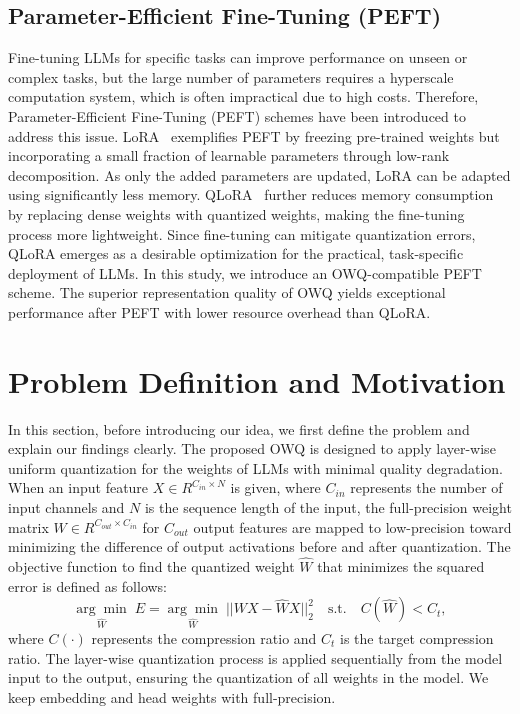 \documentclass[letterpaper]{article} %
\begin{document}
\subsection{Parameter-Efficient Fine-Tuning (PEFT)}
Fine-tuning LLMs for specific tasks can improve performance on unseen or complex tasks, but the large number of parameters requires a hyperscale computation system, which is often impractical due to high costs. Therefore, Parameter-Efficient Fine-Tuning (PEFT) schemes have been introduced to address this issue. LoRA~\cite{lora2022} exemplifies PEFT by freezing pre-trained weights but incorporating a small fraction of learnable parameters through low-rank decomposition. As only the added parameters are updated, LoRA can be adapted using significantly less memory. QLoRA~\cite{qlora2023} further reduces memory consumption by replacing dense weights with quantized weights, making the fine-tuning process more lightweight. Since fine-tuning can mitigate quantization errors, QLoRA emerges as a desirable optimization for the practical, task-specific deployment of LLMs. In this study, we introduce an OWQ-compatible PEFT scheme. The superior representation quality of OWQ yields exceptional performance after PEFT with lower resource overhead than QLoRA.

\section{Problem Definition and Motivation}

In this section, before introducing our idea, we first define the problem and explain our findings clearly. The proposed OWQ is designed to apply layer-wise uniform quantization for the weights of LLMs with minimal quality degradation. When an input feature $X \in R^{C_{in} \times N}$ is given, where $C_{in}$ represents the number of input channels and $N$ is the sequence length of the input, the full-precision weight matrix $W \in R^{C_{out} \times C_{in}}$ for $C_{out}$ output features are mapped to low-precision toward minimizing the difference of output activations before and after quantization. The objective function to find the quantized weight $\hat{W}$ that minimizes the squared error is defined as follows:
\begin{equation}
\underset{{\hat{W}}}{\arg\min} \; E = \underset{{\hat{W}}}{\arg\min} \; || W X - \hat{W} X ||_2^2 \quad \text{s.t.} \quad C(\hat{W})<C_t,
\label{eq:error}
\end{equation}
where $C(\cdot)$ represents the compression ratio and $C_t$ is the target compression ratio. 
The layer-wise quantization process is applied sequentially from the model input to the output, ensuring the quantization of all weights in the model. We keep embedding and head weights with full-precision.
\end{document}
